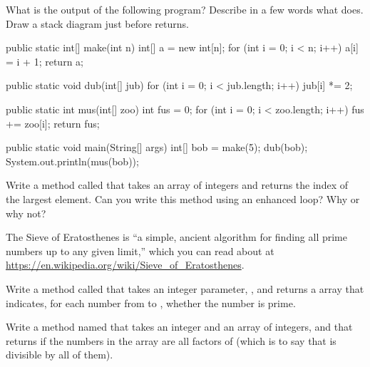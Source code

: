 \begin{exercise}
What is the output of the following program?
Describe in a few words what  does.
Draw a stack diagram just before  returns.

\begin{code}
public static int[] make(int n) {
    int[] a = new int[n];
    for (int i = 0; i < n; i++) {
        a[i] = i + 1;
    }
    return a;
}
\end{code}

\begin{code}
public static void dub(int[] jub) {
    for (int i = 0; i < jub.length; i++) {
        jub[i] *= 2;
    }
}
\end{code}

\begin{code}
public static int mus(int[] zoo) {
    int fus = 0;
    for (int i = 0; i < zoo.length; i++) {
        fus += zoo[i];
    }
    return fus;
}
\end{code}

\begin{code}
public static void main(String[] args) {
    int[] bob = make(5);
    dub(bob);
    System.out.println(mus(bob));
}
\end{code}
\end{exercise}


\begin{exercise}
Write a method called  that takes an array of integers and returns the index of the largest element.
Can you write this method using an enhanced  loop?
Why or why not?
\end{exercise}


\begin{exercise}
The Sieve of Eratosthenes is ``a simple, ancient algorithm for finding all prime numbers up to any given limit,'' which you can read about at \url{https://en.wikipedia.org/wiki/Sieve_of_Eratosthenes}.

Write a method called  that takes an integer parameter, , and returns a  array that indicates, for each number from  to , whether the number is prime.
\end{exercise}


\begin{exercise}
Write a method named  that takes an integer  and an array of integers, and that returns  if the numbers in the array are all factors of  (which is to say that  is divisible by all of them).
\end{exercise}


